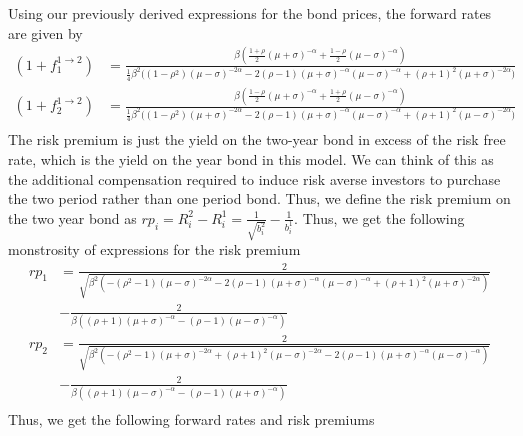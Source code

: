 \documentclass[french]{article}
\begin{document}
\begin{enumerate}[I.]
 Using our previously derived expressions for the bond prices, the forward rates are given by
 \begin{equation*}
 	\begin{split}
 	(1+f_1^{1\to2}) &= \frac{\beta \left(\frac{1+\rho}{2}(\mu+\sigma)^{-\alpha} + \frac{1-\rho}{2}(\mu-\sigma)^{-\alpha}\right)}{\frac{1}{4} \beta ^2 \bigg(\left(1-\rho ^2\right)(\mu -\sigma )^{-2 \alpha }-2 (\rho -1) (\mu+\sigma)^{-\alpha } (\mu -\sigma )^{-\alpha}+(\rho +1)^2 (\mu +\sigma )^{-2 \alpha }\bigg)}\\
 	(1+f_2^{1\to2}) &= \frac{\beta \left(\frac{1-\rho}{2}(\mu+\sigma)^{-\alpha} + \frac{1+\rho}{2}(\mu-\sigma)^{-\alpha}\right)}{\frac{1}{4} \beta ^2 \bigg(\left(1-\rho^2\right)(\mu +\sigma )^{-2 \alpha }-2 (\rho -1) (\mu +\sigma)^{-\alpha } (\mu -\sigma )^{-\alpha }+(\rho +1)^2 (\mu-\sigma )^{-2\alpha }\bigg)}\\
 	\end{split}
 \end{equation*}
The risk premium is just the yield on the two-year bond in excess of the risk free rate, which is the yield on the year bond in this model. We can think of this as the additional compensation required to induce risk averse investors to purchase the two period rather than one period bond. Thus, we define the risk premium on the two year bond as $rp_i = R_i^2 - R_i^1 = \frac{1}{\sqrt{b^2_i}} - \frac{1}{b^1_i}$. Thus, we get the following monstrosity of expressions for the risk premium 
\begin{equation*}
	\begin{split}
	rp_1 &=\frac{2}{\sqrt{\beta ^2 \left(-\left(\rho ^2-1\right)
			(\mu -\sigma )^{-2 \alpha }-2 (\rho -1) (\mu
			+\sigma )^{-\alpha } (\mu -\sigma )^{-\alpha
			}+(\rho +1)^2 (\mu +\sigma )^{-2 \alpha
			}\right)}}\\
		&-\frac{2}{\beta  \left((\rho +1) (\mu
		+\sigma )^{-\alpha }-(\rho -1) (\mu -\sigma
		)^{-\alpha }\right)}\\
    rp_2 &=\frac{2}{\sqrt{\beta ^2 \left(-\left(\rho ^2-1\right)
    		(\mu +\sigma )^{-2 \alpha }+(\rho +1)^2 (\mu
    		-\sigma )^{-2 \alpha }-2 (\rho -1) (\mu +\sigma
    		)^{-\alpha } (\mu -\sigma )^{-\alpha
    		}\right)}}\\
    	&-\frac{2}{\beta  \left((\rho +1) (\mu
    	-\sigma )^{-\alpha }-(\rho -1) (\mu +\sigma
    	)^{-\alpha }\right)}\\	
   \end{split}
\end{equation*}
Thus, we get the following forward rates and risk premiums 

\end{enumerate}
\end{document}
